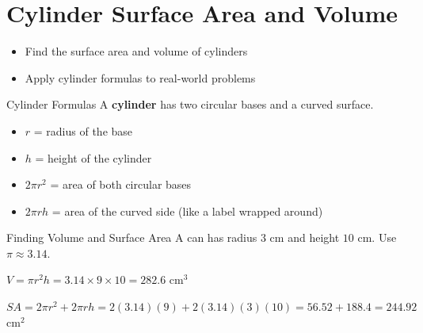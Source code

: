 \section{Cylinder Surface Area and Volume}

\begin{learningGoals}
\begin{itemize}
    \item Find the surface area and volume of cylinders
    \item Apply cylinder formulas to real-world problems
\end{itemize}
\end{learningGoals}

\begin{conceptBox}{Cylinder Formulas}
A \textbf{cylinder} has two circular bases and a curved surface.



\begin{itemize}[leftmargin=*]
    \item $r$ = radius of the base
    \item $h$ = height of the cylinder
    \item $2\pi r^2$ = area of both circular bases
    \item $2\pi rh$ = area of the curved side (like a label wrapped around)
\end{itemize}
\end{conceptBox}

\begin{workedExample}{Finding Volume and Surface Area}
A can has radius $3$ cm and height $10$ cm. Use $\pi \approx 3.14$.

$V = \pi r^2 h = 3.14 \times 9 \times 10 = 282.6$ cm$^3$

$SA = 2\pi r^2 + 2\pi rh = 2(3.14)(9) + 2(3.14)(3)(10) = 56.52 + 188.4 = 244.92$ cm$^2$
\end{workedExample}


